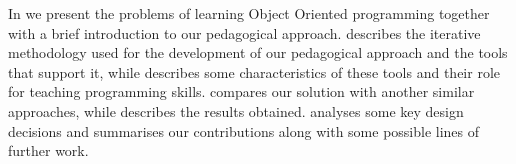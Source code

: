 \smallskip
In  we present the problems of learning Object Oriented programming
together with a brief introduction to our pedagogical approach. 
 describes the iterative methodology 
used for the development of our pedagogical approach 
and the tools that support it,
while  describes some characteristics of these tools
and their role for teaching programming skills.
 compares our solution with another similar approaches, while
 describes the results obtained.
 analyses some key design decisions
and  summarises our contributions
along with some possible lines of further work.


